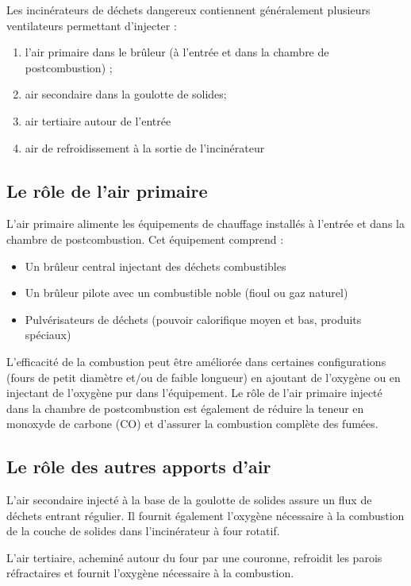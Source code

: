 Les incinérateurs de déchets dangereux contiennent généralement plusieurs ventilateurs permettant d'injecter :
\begin{enumerate}
    \item l'air primaire dans le brûleur (à l'entrée et dans la chambre de postcombustion) ;
    \item air secondaire dans la goulotte de solides;
    \item air tertiaire autour de l'entrée
    \item air de refroidissement à la sortie de l'incinérateur
\end{enumerate}

\subsection{Le rôle de l'air primaire} 

L'air primaire alimente les équipements de chauffage installés à l'entrée et dans la chambre de postcombustion.
Cet équipement comprend :
\begin{itemize}
    \item Un brûleur central injectant des déchets combustibles
    \item Un brûleur pilote avec un combustible noble (fioul ou gaz naturel)
    \item Pulvérisateurs de déchets (pouvoir calorifique moyen et bas, produits spéciaux)
\end{itemize}
\vspace{0.3cm}
L'efficacité de la combustion peut être améliorée dans certaines configurations (fours de petit diamètre et/ou de faible longueur) en ajoutant de l'oxygène ou en injectant de l'oxygène pur dans l'équipement.
Le rôle de l'air primaire injecté dans la chambre de postcombustion est également de réduire la teneur en monoxyde de carbone (CO) et d'assurer la combustion complète des fumées.


\subsection{Le rôle des autres apports d'air}

L'air secondaire injecté à la base de la goulotte de solides assure un flux de déchets entrant régulier.
Il fournit également l'oxygène nécessaire à la combustion de la couche de solides dans l'incinérateur à four rotatif.
\vspace{0.3cm}

L'air tertiaire, acheminé autour du four par une couronne, refroidit les parois réfractaires et fournit l'oxygène nécessaire à la combustion.

